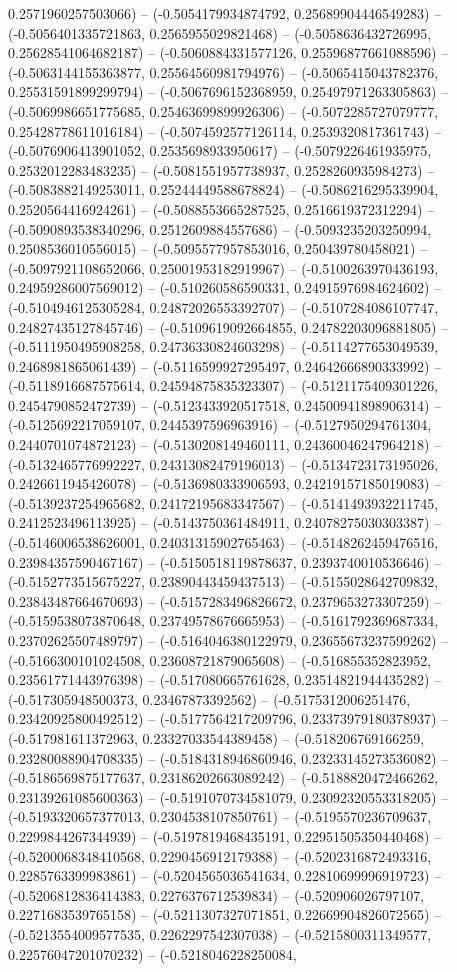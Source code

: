0.2571960257503066) -- (-0.5054179934874792, 0.25689904446549283) -- (-0.5056401335721863, 0.2565955029821468) -- (-0.5058636432726995, 0.25628541064682187) -- (-0.5060884331577126, 0.25596877661088596) -- (-0.5063144155363877, 0.25564560981794976) -- (-0.5065415043782376, 0.25531591899299794) -- (-0.5067696152368959, 0.25497971263305863) -- (-0.5069986651775685, 0.25463699899926306) -- (-0.5072285727079777, 0.25428778611016184) -- (-0.5074592577126114, 0.2539320817361743) -- (-0.5076906413901052, 0.2535698933950617) -- (-0.5079226461935975, 0.2532012283483235) -- (-0.5081551957738937, 0.2528260935984273) -- (-0.5083882149253011, 0.25244449588678824) -- (-0.5086216295339904, 0.2520564416924261) -- (-0.5088553665287525, 0.2516619372312294) -- (-0.5090893538340296, 0.2512609884557686) -- (-0.5093235203250994, 0.2508536010556015) -- (-0.5095577957853016, 0.250439780458021) -- (-0.5097921108652066, 0.25001953182919967) -- (-0.5100263970436193, 0.24959286007569012) -- (-0.510260586590331, 0.24915976984624602) -- (-0.5104946125305284, 0.24872026553392707) -- (-0.5107284086107747, 0.24827435127845746) -- (-0.5109619092664855, 0.24782203096881805) -- (-0.5111950495908258, 0.24736330824603298) -- (-0.5114277653049539, 0.2468981865061439) -- (-0.5116599927295497, 0.24642666890333992) -- (-0.5118916687575614, 0.24594875835323307) -- (-0.5121175409301226, 0.2454790852472739) -- (-0.5123433920517518, 0.24500941898906314) -- (-0.5125692217059107, 0.2445397596963916) -- (-0.5127950294761304, 0.2440701074872123) -- (-0.5130208149460111, 0.24360046247964218) -- (-0.5132465776992227, 0.24313082479196013) -- (-0.5134723173195026, 0.2426611945426078) -- (-0.5136980333906593, 0.24219157185019083) -- (-0.5139237254965682, 0.24172195683347567) -- (-0.5141493932211745, 0.2412523496113925) -- (-0.5143750361484911, 0.24078275030303387) -- (-0.5146006538626001, 0.24031315902765463) -- (-0.5148262459476516, 0.23984357590467167) -- (-0.5150518119878637, 0.2393740010536646) -- (-0.5152773515675227, 0.23890443459437513) -- (-0.5155028642709832, 0.23843487664670693) -- (-0.5157283496826672, 0.2379653273307259) -- (-0.5159538073870648, 0.23749578676665953) -- (-0.5161792369687334, 0.23702625507489797) -- (-0.5164046380122979, 0.23655673237599262) -- (-0.5166300101024508, 0.23608721879065608) -- (-0.516855352823952, 0.23561771443976398) -- (-0.517080665761628, 0.23514821944435282) -- (-0.517305948500373, 0.23467873392562) -- (-0.5175312006251476, 0.23420925800492512) -- (-0.5177564217209796, 0.23373979180378937) -- (-0.517981611372963, 0.23327033544389458) -- (-0.518206769166259, 0.23280088904708335) -- (-0.5184318946860946, 0.23233145273536082) -- (-0.5186569875177637, 0.23186202663089242) -- (-0.5188820472466262, 0.23139261085600363) -- (-0.5191070734581079, 0.23092320553318205) -- (-0.5193320657377013, 0.2304538107850761) -- (-0.5195570236709637, 0.2299844267344939) -- (-0.5197819468435191, 0.22951505350440468) -- (-0.5200068348410568, 0.2290456912179388) -- (-0.5202316872493316, 0.2285763399983861) -- (-0.5204565036541634, 0.22810699996919723) -- (-0.5206812836414383, 0.2276376712539834) -- (-0.520906026797107, 0.2271683539765158) -- (-0.5211307327071851, 0.22669904826072565) -- (-0.5213554009577535, 0.2262297542307038) -- (-0.5215800311349577, 0.22576047201070232) -- (-0.5218046228250084, 